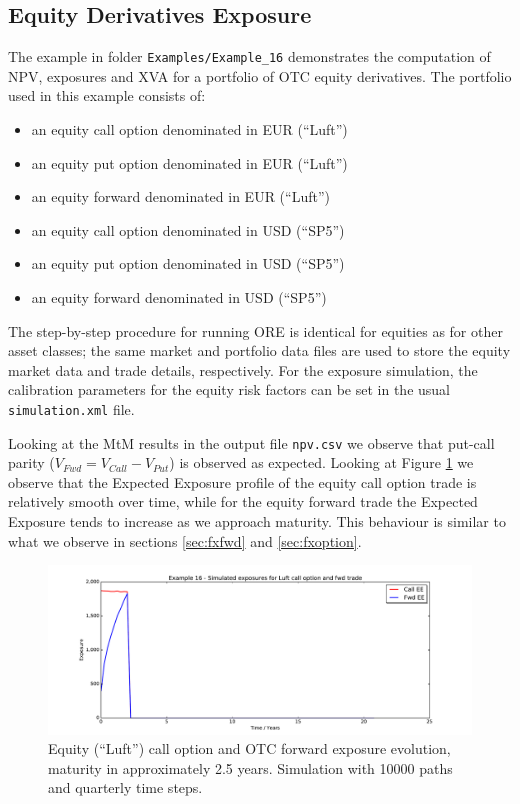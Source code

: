 \documentclass[12pt, a4paper]{article}
\begin{document}
\subsection{Equity Derivatives Exposure}\label{ex:equityderivatives}

The example in folder {\tt Examples/Example\_16} demonstrates the computation of NPV, exposures and XVA for a portfolio 
of OTC equity derivatives. The portfolio used in this example consists of:

\begin{itemize}
	\item an equity call option denominated in EUR (``Luft'')
	\item an equity put option denominated in EUR (``Luft'')
	\item an equity forward denominated in EUR (``Luft'')
	\item an equity call option denominated in USD (``SP5'')
	\item an equity put option denominated in USD (``SP5'')
	\item an equity forward denominated in USD (``SP5'')
\end{itemize}

The step-by-step procedure for running ORE is identical for equities as for other asset classes; the same market and 
portfolio data files are used to store the equity market data and trade details, respectively. For the exposure 
simulation, the calibration parameters for the equity risk factors can be set in the usual {\tt simulation.xml} file.

Looking at the MtM results in the output file {\tt npv.csv} we observe that put-call parity ($V_{Fwd} = V_{Call} - 
V_{Put}$) is observed as expected. Looking at Figure \ref{fig_eq_call} we observe that the Expected Exposure profile of 
the equity call option trade is relatively smooth over time, while for the equity forward trade the Expected Exposure 
tends to increase as we approach maturity. This behaviour is similar to what we observe in sections \ref{sec:fxfwd} 
and \ref{sec:fxoption}. 

\begin{figure}[h!]
	\begin{center}
		\includegraphics[scale=0.45]{mpl_eq_call.pdf}
	\end{center}
	\caption{Equity (``Luft'') call option and OTC forward exposure evolution, maturity in approximately 2.5 years. 
	Simulation with 
	10000 paths and quarterly time steps.}
	\label{fig_eq_call}
\end{figure}
\end{document}
